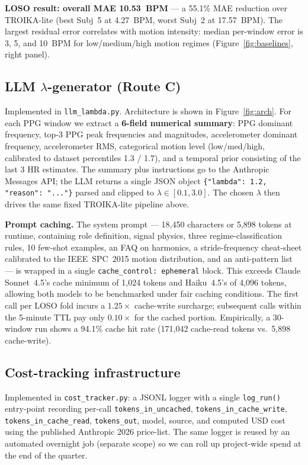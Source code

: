 \documentclass[sigconf,nonacm,balance]{acmart}
\begin{document}
\textbf{LOSO result: overall MAE 10.53~BPM} --- a 55.1\% MAE reduction over TROIKA-lite (best Subj~5 at 4.27~BPM, worst Subj~2 at 17.57~BPM). The largest residual error correlates with motion intensity: median per-window error is 3, 5, and 10~BPM for low/medium/high motion regimes (Figure~\ref{fig:baselines}, right panel).

\subsection{LLM $\lambda$-generator (Route C)}
Implemented in \texttt{llm\_lambda.py}. Architecture is shown in Figure~\ref{fig:arch}. For each PPG window we extract a \textbf{6-field numerical summary}: PPG dominant frequency, top-3 PPG peak frequencies and magnitudes, accelerometer dominant frequency, accelerometer RMS, categorical motion level (low/med/high, calibrated to dataset percentiles 1.3 / 1.7), and a temporal prior consisting of the last 3 HR estimates. The summary plus instructions go to the Anthropic Messages API; the LLM returns a single JSON object \texttt{\{"lambda": 1.2, "reason": "..."\}} parsed and clipped to $\lambda \in [0.1, 3.0]$. The chosen $\lambda$ then drives the same fixed TROIKA-lite pipeline above.

\textbf{Prompt caching.} The system prompt --- 18{,}450 characters or 5{,}898 tokens at runtime, containing role definition, signal physics, three regime-classification rules, 10 few-shot examples, an FAQ on harmonics, a stride-frequency cheat-sheet calibrated to the IEEE~SPC~2015 motion distribution, and an anti-pattern list --- is wrapped in a single \texttt{cache\_control: ephemeral} block. This exceeds Claude Sonnet~4.5's cache minimum of 1{,}024 tokens and Haiku~4.5's of 4{,}096 tokens, allowing both models to be benchmarked under fair caching conditions. The first call per LOSO fold incurs a $1.25\times$ cache-write surcharge; subsequent calls within the 5-minute TTL pay only $0.10\times$ for the cached portion. Empirically, a 30-window run shows a 94.1\% cache hit rate (171{,}042 cache-read tokens vs.\ 5{,}898 cache-write).

\subsection{Cost-tracking infrastructure}
Implemented in \texttt{cost\_tracker.py}: a JSONL logger with a single \texttt{log\_run()} entry-point recording per-call \texttt{tokens\_in\_uncached}, \texttt{tokens\_in\_cache\_write}, \texttt{tokens\_in\_cache\_read}, \texttt{tokens\_out}, model, source, and computed USD cost using the published Anthropic 2026 price-list. The same logger is reused by an automated overnight job (separate scope) so we can roll up project-wide spend at the end of the quarter.
\end{document}

